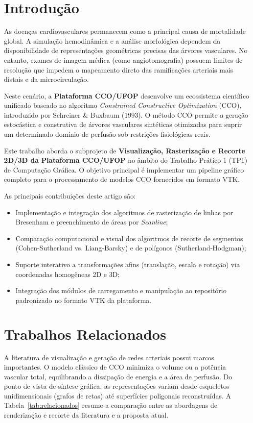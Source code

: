 \documentclass[11pt, a4paper]{article}
\begin{document}
\vspace{0.4cm}

\section{Introdução}
As doenças cardiovasculares permanecem como a principal causa de mortalidade global. A simulação hemodinâmica e a análise morfológica dependem da disponibilidade de representações geométricas precisas das árvores vasculares. No entanto, exames de imagem médica (como angiotomografia) possuem limites de resolução que impedem o mapeamento direto das ramificações arteriais mais distais e da microcirculação.

Neste cenário, a \textbf{Plataforma CCO/UFOP} desenvolve um ecossistema científico unificado baseado no algoritmo \emph{Constrained Constructive Optimization} (CCO), introduzido por Schreiner \& Buxbaum (1993). O método CCO permite a geração estocástica e construtiva de árvores vasculares sintéticas otimizadas para suprir um determinado domínio de perfusão sob restrições fisiológicas reais.

Este trabalho aborda o subprojeto de \textbf{Visualização, Rasterização e Recorte 2D/3D da Plataforma CCO/UFOP} no âmbito do Trabalho Prático 1 (TP1) de Computação Gráfica. O objetivo principal é implementar um pipeline gráfico completo para o processamento de modelos CCO fornecidos em formato VTK.

As principais contribuições deste artigo são:
\begin{itemize}[leftmargin=*]
  \item Implementação e integração dos algoritmos de rasterização de linhas por Bresenham e preenchimento de áreas por \textit{Scanline};
  \item Comparação computacional e visual dos algoritmos de recorte de segmentos (Cohen-Sutherland vs. Liang-Barsky) e de polígonos (Sutherland-Hodgman);
  \item Suporte interativo a transformações afins (translação, escala e rotação) via coordenadas homogêneas 2D e 3D;
  \item Integração dos módulos de carregamento e manipulação ao repositório padronizado no formato VTK da plataforma.
\end{itemize}

\section{Trabalhos Relacionados}
A literatura de visualização e geração de redes arteriais possui marcos importantes. O modelo clássico de CCO minimiza o volume ou a potência vascular total, equilibrando a dissipação de energia e a área de perfusão. Do ponto de vista de síntese gráfica, as representações variam desde esqueletos unidimensionais (grafos de retas) até superfícies poligonais reconstruídas. A Tabela~\ref{tab:relacionados} resume a comparação entre as abordagens de renderização e recorte da literatura e a proposta atual.
\end{document}
